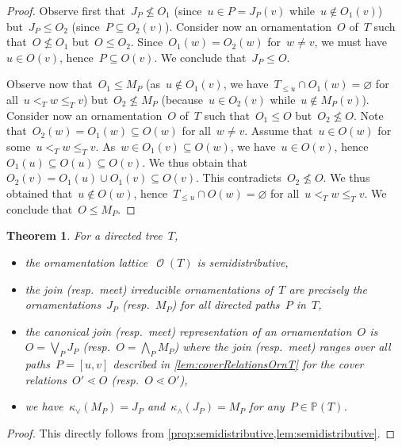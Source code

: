 \documentclass{amsart}
\newtheorem{theorem}{Theorem}[section]
\theoremstyle{definition}
\renewcommand{\c}[1]{\mathcal{#1}} %
\newcommand{\meet}{\wedge} %
\newcommand{\join}{\vee} %
\newcommand{\bigMeet}{\bigwedge} %
\newcommand{\bigJoin}{\bigvee} %
\newcommand{\lessin}[2]{#1_{\le#2}} %
\DeclareMathOperator{\Orn}{\c{O}}  %
\newcommand{\PP}{\mathbb P} %
\begin{document}
\begin{proof}
Observe first that~$J_P \not\le O_1$ (since~$u \in P = J_P(v)$ while~$u \notin O_1(v)$) but~$J_P \le O_2$ (since~${P \subseteq O_2(v)}$). 
Consider now an ornamentation~$O$ of~$T$ such that~$O \not\le O_1$ but~$O \le O_2$.
Since~$O_1(w) = O_2(w)$ for~$w \ne v$, we must have~$u \in O(v)$, hence~$P \subseteq O(v)$.
We conclude that~$J_P \le O$.

Observe now that~$O_1 \le M_P$ (as~$u \notin O_1(v)$, we have~$\lessin{T}{u} \cap O_1(w) = \varnothing$ for all~$u <_T w \le_T v$) but~$O_2 \not\le M_P$ (because~$u \in O_2(v)$ while~$u \notin M_P(v)$).
Consider now an ornamentation~$O$ of~$T$ such that~$O_1 \le O$ but~$O_2 \not\le O$.
Note that~$O_2(w) = O_1(w) \subseteq O(w)$ for all~$w \ne v$.
Assume that~$u \in O(w)$ for some~$u <_T w \le_T v$.
As~$w \in O_1(v) \subseteq O(w)$, we have~$u \in O(v)$, hence~$O_1(u) \subseteq O(u) \subseteq O(v)$.
We thus obtain that~$O_2(v) = O_1(u) \cup O_1(v) \subseteq O(v)$.
This contradicts~$O_2 \not\le O$.
We thus obtained that~$u \notin O(w)$, hence~$\lessin{T}{u} \cap O(w) = \varnothing$ for all~$u <_T w \le_T v$.
We conclude that~$O \le M_P$.
\end{proof}

\begin{theorem}
\label{thm:OrnSemidistributiveT}
For a directed tree~$T$, 
\begin{itemize}
\item the ornamentation lattice~$\Orn(T)$ is semidistributive,
\item the join (resp.~meet) irreducible ornamentations of~$T$ are precisely the ornamentations~$J_P$ (resp.~$M_P$) for all directed paths~$P$ in~$T$,
\item the canonical join (resp.~meet) representation of an ornamentation~$O$ is~$O = \bigJoin_P J_P$ (resp.~$O = \bigMeet_P M_P$) where the join (resp.~meet) ranges over all paths~$P = [u,v]$ described in \cref{lem:coverRelationsOrnT} for the cover relations~$O' \lessdot O$ (resp.~$O \lessdot O'$),
\item we have~$\kappa_\join(M_P) = J_P$ and~$\kappa_\meet(J_P) = M_P$ for any~$P \in \PP(T)$.
\end{itemize}
\end{theorem}

\begin{proof}
This directly follows from \cref{prop:semidistributive,lem:semidistributive}.
\end{proof}
\end{document}
